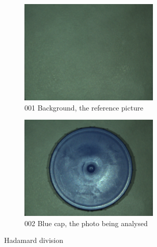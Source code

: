 \documentclass{article}
\begin{document}
\begin{figure}[h]
    \begin{subfigure}{0.5\textwidth}
        \includegraphics[width=0.9\linewidth, height=5cm]{figures/camera_pictures_png/001_background.png}
        \caption{001 Background, the reference picture}
        \label{fig:001_background}
        \end{subfigure}%
        \begin{subfigure}{0.5\textwidth}
        \includegraphics[width=0.9\linewidth, height=5cm]{figures/camera_pictures_png/002_blue_cap.png}
        \caption{002 Blue cap, the photo being analysed}
        \label{fig:002_blue_cap}
    \end{subfigure}
    
    \caption{Hadamard division}
    \label{fig:hadamard_division}
\end{figure}
\end{document}
